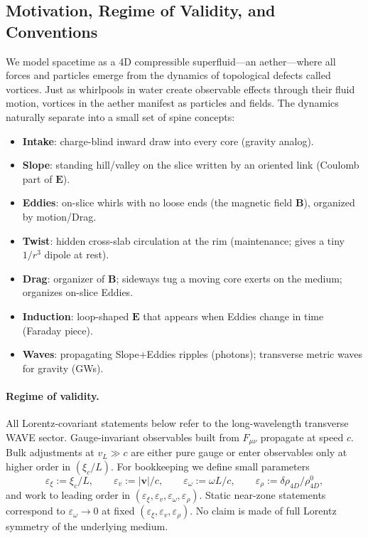 \subsection{Motivation, Regime of Validity, and Conventions}
\label{sec:motivation-conventions}

We model spacetime as a 4D compressible superfluid---an aether---where all forces and particles emerge from the dynamics of topological defects called vortices. Just as whirlpools in water create observable effects through their fluid motion, vortices in the aether manifest as particles and fields. The dynamics naturally separate into a small set of spine concepts:
\begin{itemize}
  \item \textbf{Intake}: charge-blind inward draw into every core (gravity analog).
  \item \textbf{Slope}: standing hill/valley on the slice written by an oriented link (Coulomb part of $\mathbf E$).
  \item \textbf{Eddies}: on-slice whirls with no loose ends (the magnetic field $\mathbf B$), organized by motion/Drag.
  \item \textbf{Twist}: hidden cross-slab circulation at the rim (maintenance; gives a tiny $1/r^3$ dipole at rest).
  \item \textbf{Drag}: organizer of $\mathbf B$; sideways tug a moving core exerts on the medium; organizes on-slice Eddies.
  \item \textbf{Induction}: loop-shaped $\mathbf E$ that appears when Eddies change in time (Faraday piece).
  \item \textbf{Waves}: propagating Slope+Eddies ripples (photons); transverse metric waves for gravity (GWs).
\end{itemize}
\paragraph{Regime of validity.} All Lorentz-covariant statements below refer to the long-wavelength transverse WAVE sector. Gauge-invariant observables built from $F_{\mu\nu}$ propagate at speed $c$. Bulk adjustments at $v_L\gg c$ are either pure gauge or enter observables only at higher order in $(\xi_c/L)$. For bookkeeping we define small parameters
\[
\varepsilon_\xi:=\xi_c/L,\qquad
\varepsilon_v:=|\mathbf v|/c,\qquad
\varepsilon_\omega:=\omega L/c,\qquad
\varepsilon_\rho:=\delta\rho_{4D}/\rho_{4D}^0,
\]
and work to leading order in $(\varepsilon_\xi,\varepsilon_v,\varepsilon_\omega,\varepsilon_\rho)$. Static near-zone statements correspond to $\varepsilon_\omega\to0$ at fixed $(\varepsilon_\xi,\varepsilon_v,\varepsilon_\rho)$. No claim is made of full Lorentz symmetry of the underlying medium.

